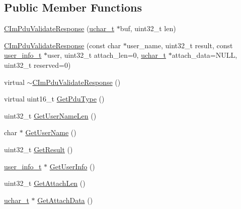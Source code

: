 \subsection*{Public Member Functions}
\begin{DoxyCompactItemize}
\item 
\hyperlink{class_c_im_pdu_validate_response_aaae37c48c088dbfcd54065ff68af9fd4}{C\+Im\+Pdu\+Validate\+Response} (\hyperlink{base_2ostype_8h_a124ea0f8f4a23a0a286b5582137f0b8d}{uchar\+\_\+t} $\ast$buf, uint32\+\_\+t len)
\item 
\hyperlink{class_c_im_pdu_validate_response_a7fae2cd3b9c3b2776ce4bf58a2534a76}{C\+Im\+Pdu\+Validate\+Response} (const char $\ast$user\+\_\+name, uint32\+\_\+t result, const \hyperlink{structuser__info__t}{user\+\_\+info\+\_\+t} $\ast$user, uint32\+\_\+t attach\+\_\+len=0, \hyperlink{base_2ostype_8h_a124ea0f8f4a23a0a286b5582137f0b8d}{uchar\+\_\+t} $\ast$attach\+\_\+data=N\+U\+L\+L, uint32\+\_\+t reserved=0)
\item 
virtual \hyperlink{class_c_im_pdu_validate_response_a8c69d8e04db56d373dccf81eb99afbe9}{$\sim$\+C\+Im\+Pdu\+Validate\+Response} ()
\item 
virtual uint16\+\_\+t \hyperlink{class_c_im_pdu_validate_response_ae82feee69cf1bd0a49ed9305c37d8eb4}{Get\+Pdu\+Type} ()
\item 
uint32\+\_\+t \hyperlink{class_c_im_pdu_validate_response_ac6d0c7b5e760c0e78485ceab3cfcf46f}{Get\+User\+Name\+Len} ()
\item 
char $\ast$ \hyperlink{class_c_im_pdu_validate_response_ab599c62836c05e9ba6a5d8475faec173}{Get\+User\+Name} ()
\item 
uint32\+\_\+t \hyperlink{class_c_im_pdu_validate_response_a26b88c984f5555770aa875db2bdf2156}{Get\+Result} ()
\item 
\hyperlink{structuser__info__t}{user\+\_\+info\+\_\+t} $\ast$ \hyperlink{class_c_im_pdu_validate_response_a449e49751d2463892d864561c22d6a4e}{Get\+User\+Info} ()
\item 
uint32\+\_\+t \hyperlink{class_c_im_pdu_validate_response_ac01111c334aaadd7c3f1d5101639421e}{Get\+Attach\+Len} ()
\item 
\hyperlink{base_2ostype_8h_a124ea0f8f4a23a0a286b5582137f0b8d}{uchar\+\_\+t} $\ast$ \hyperlink{class_c_im_pdu_validate_response_a794d78e60f5e9b212d103ae3579225f0}{Get\+Attach\+Data} ()
\end{DoxyCompactItemize}
